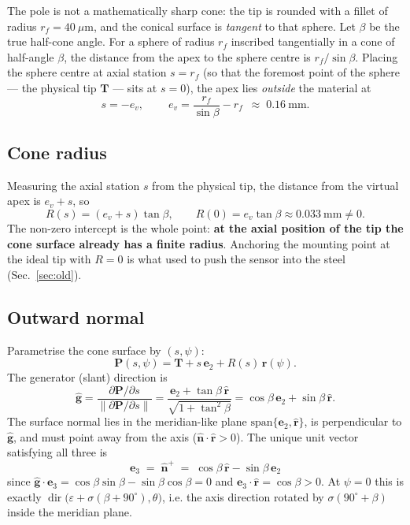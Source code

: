 \documentclass[12pt]{article}
\newcommand{\ehat}[1]{\mathbf{e}_{#1}}
\newcommand{\rhat}{\hat{\mathbf{r}}}
\newcommand{\nhat}{\hat{\mathbf{n}}}
\newcommand{\dir}{\operatorname{dir}}
\begin{document}
The pole is not a mathematically sharp cone: the tip is rounded with a fillet of
radius $r_f=40\ \mu$m, and the conical surface is \emph{tangent} to that sphere. Let
$\beta$ be the true half-cone angle. For a sphere of radius $r_f$ inscribed tangentially
in a cone of half-angle $\beta$, the distance from the apex to the sphere centre is
$r_f/\sin\beta$. Placing the sphere centre at axial station $s=r_f$ (so that the
foremost point of the sphere --- the physical tip $\mathbf{T}$ --- sits at $s=0$), the
apex lies \emph{outside} the material at
\begin{equation}
s=-e_v,\qquad
\boxed{\ e_v=\frac{r_f}{\sin\beta}-r_f\ }\;\approx\;0.16\ \mathrm{mm}.
\label{eq:apex}
\end{equation}

\subsection{Cone radius}

Measuring the axial station $s$ from the physical tip, the distance from the virtual
apex is $e_v+s$, so
\begin{equation}
R(s)=(e_v+s)\tan\beta,
\qquad
R(0)=e_v\tan\beta\approx 0.033\ \mathrm{mm}\neq 0 .
\label{eq:radius}
\end{equation}
The non-zero intercept is the whole point: \textbf{at the axial position of the tip the
cone surface already has a finite radius}. Anchoring the mounting point at the ideal
tip with $R=0$ is what used to push the sensor into the steel (Sec.~\ref{sec:old}).

\subsection{Outward normal}

Parametrise the cone surface by $(s,\psi)$:
\begin{equation}
\mathbf{P}(s,\psi)=\mathbf{T}+s\,\ehat{2}+R(s)\,\rhat(\psi).
\end{equation}
The generator (slant) direction is
\begin{equation}
\hat{\mathbf{g}}
=\frac{\partial\mathbf{P}/\partial s}{\|\partial\mathbf{P}/\partial s\|}
=\frac{\ehat{2}+\tan\beta\,\rhat}{\sqrt{1+\tan^2\beta}}
=\cos\beta\,\ehat{2}+\sin\beta\,\rhat .
\label{eq:gen}
\end{equation}
The surface normal lies in the meridian-like plane $\mathrm{span}\{\ehat{2},\rhat\}$,
is perpendicular to $\hat{\mathbf{g}}$, and must point away from the axis
($\nhat\cdot\rhat>0$). The unique unit vector satisfying all three is
\begin{equation}
\boxed{\ \ehat{3}\;=\;\nhat^{+}\;=\;\cos\beta\,\rhat-\sin\beta\,\ehat{2}\ }
\label{eq:normal}
\end{equation}
since $\hat{\mathbf{g}}\cdot\ehat{3}=\cos\beta\sin\beta-\sin\beta\cos\beta=0$ and
$\ehat{3}\cdot\rhat=\cos\beta>0$. At $\psi=0$ this is exactly
$\dir\!\big(\varepsilon+\sigma(\beta+90^\circ),\theta\big)$, i.e. the axis direction
rotated by $\sigma(90^\circ+\beta)$ inside the meridian plane.
\end{document}
